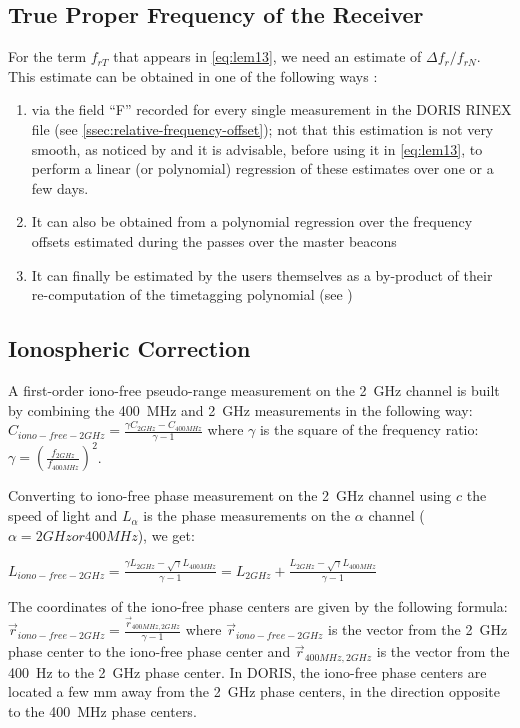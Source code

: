 \subsection{True Proper Frequency of the Receiver}
\label{ssec:true-proprtfrequency-of-the-receiver}

For the term \(f_{rT}\) that appears in \ref{eq:lem13}, we need an estimate of \(\Delta f_{r} / f_{rN}\). 
This estimate can be obtained in one of the following ways \cite{lemoine-2016}:
\begin{enumerate}
    \item via the field ``F'' recorded for every single measurement in the DORIS 
    RINEX file (see \ref{ssec:relative-frequency-offset}); not that this estimation 
    is not very smooth, as noticed by \cite{GAO2015} and it is advisable, before 
    using it in \ref{eq:lem13}, to perform a linear (or polynomial) regression of 
    these estimates over one or a few days.

    \item It can also be obtained from a polynomial regression
    over the frequency oﬀsets estimated during the passes
    over the master beacons

    \item It can ﬁnally be estimated by the users themselves as a
    by-product of their re-computation of the timetagging polynomial (see \cite{MERCIER2010})
\end{enumerate}

\subsection{Ionospheric Correction}
A ﬁrst-order iono-free pseudo-range measurement on the \SI{2}{\GHz} channel is built by combining
the \SI{400}{\MHz} and \SI{2}{\GHz} measurements in the following way:
\(C_{iono-free-2GHz} = \frac{\gamma C_{2GHz} - C_{400MHz}}{\gamma - 1}\)
where \(\gamma\) is the square of the frequency ratio: 
\(\gamma = {(\frac{f_{2GHz}}{f_{400MHz}})}^2\).

Converting to iono-free phase measurement on the \SI{2}{\GHz} channel using \(c\)  the speed 
of light and \(L_{\alpha}\) is the phase measurements on the \(\alpha\) channel 
(\(\alpha = 2GHz or 400 MHz\)), we get:

\(L_{iono-free-2GHz} = \frac{\gamma L_{2GHz} - \sqrt{\gamma}L_{400MHz}}{\gamma - 1} 
= L_{2GHz} + \frac{L_{2GHz} - \sqrt{\gamma}L_{400MHz}}{\gamma - 1} \)

The coordinates of the iono-free phase centers are given by the following formula:
\(\vec{r}_{iono-free-2GHz} = \frac{\vec{r}_{400MHz,2GHz}}{\gamma - 1}\)
where \(\vec{r}_{iono-free-2GHz}\) is the vector from the \SI{2}{\GHz} phase center to 
the iono-free phase center and \(\vec{r}_{400MHz,2GHz}\) is the vector from the 
\SI{400}{\Hz} to the \SI{2}{\GHz} phase center. In DORIS, the iono-free phase centers are
located a few mm away from the \SI{2}{\GHz} phase centers, in the direction opposite to 
the \SI{400}{\MHz} phase centers.